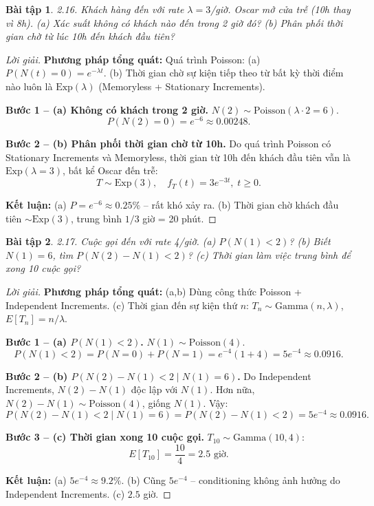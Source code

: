 \documentclass[8pt,a4paper]{article}
\newtheorem{exercise}{Bài tập}
\newenvironment{solution}{\begin{proof}[Lời giải]}{\end{proof}}
\begin{document}
\begin{exercise}
2.16. Khách hàng đến với rate $\lambda=3$/giờ. Oscar mở cửa trễ (10h thay vì 8h). 
(a) Xác suất không có khách nào đến trong 2 giờ đó?
(b) Phân phối thời gian chờ từ lúc 10h đến khách đầu tiên?
\end{exercise}
\begin{solution}
\textbf{Phương pháp tổng quát:} Quá trình Poisson: (a) $P(N(t)=0) = e^{-\lambda t}$. (b) Thời gian chờ sự kiện tiếp theo từ bất kỳ thời điểm nào luôn là $\text{Exp}(\lambda)$ (Memoryless + Stationary Increments).

\textbf{Bước 1 -- (a) Không có khách trong 2 giờ.} $N(2) \sim \text{Poisson}(\lambda \cdot 2 = 6)$.
\[
  P(N(2) = 0) = e^{-6} \approx \boxed{0.00248}.
\]

\textbf{Bước 2 -- (b) Phân phối thời gian chờ từ 10h.} Do quá trình Poisson có Stationary Increments và Memoryless, thời gian từ 10h đến khách đầu tiên vẫn là $\text{Exp}(\lambda = 3)$, bất kể Oscar đến trễ:
\[
  \boxed{T \sim \text{Exp}(3), \quad f_T(t) = 3e^{-3t}, \; t \geq 0.}
\]

\textbf{Kết luận:} (a) $P = e^{-6} \approx 0.25\%$ -- rất khó xảy ra. (b) Thời gian chờ khách đầu tiên $\sim \text{Exp}(3)$, trung bình $1/3$ giờ = 20 phút.
\end{solution}

\begin{exercise}
2.17. Cuộc gọi đến với rate 4/giờ. 
(a) $P(N(1) < 2)$? (b) Biết $N(1)=6$, tìm $P(N(2)-N(1) < 2)$? (c) Thời gian làm việc trung bình để xong 10 cuộc gọi?
\end{exercise}
\begin{solution}
\textbf{Phương pháp tổng quát:} (a,b) Dùng công thức Poisson + Independent Increments. (c) Thời gian đến sự kiện thứ $n$: $T_n \sim \text{Gamma}(n, \lambda)$, $E[T_n] = n/\lambda$.

\textbf{Bước 1 -- (a) $P(N(1) < 2)$.} $N(1) \sim \text{Poisson}(4)$.
\[
  P(N(1) < 2) = P(N=0) + P(N=1) = e^{-4}(1 + 4) = \boxed{5e^{-4} \approx 0.0916}.
\]

\textbf{Bước 2 -- (b) $P(N(2)-N(1) < 2 \mid N(1) = 6)$.} Do Independent Increments, $N(2)-N(1)$ độc lập với $N(1)$. Hơn nữa, $N(2)-N(1) \sim \text{Poisson}(4)$, giống $N(1)$. Vậy:
\[
  P(N(2)-N(1) < 2 \mid N(1) = 6) = P(N(2)-N(1) < 2) = \boxed{5e^{-4} \approx 0.0916}.
\]

\textbf{Bước 3 -- (c) Thời gian xong 10 cuộc gọi.} $T_{10} \sim \text{Gamma}(10, 4)$:
\[
  E[T_{10}] = \frac{10}{4} = \boxed{2.5 \text{ giờ}}.
\]

\textbf{Kết luận:} (a) $5e^{-4} \approx 9.2\%$. (b) Cũng $5e^{-4}$ -- conditioning không ảnh hưởng do Independent Increments. (c) $2.5$ giờ.
\end{solution}
\end{document}
